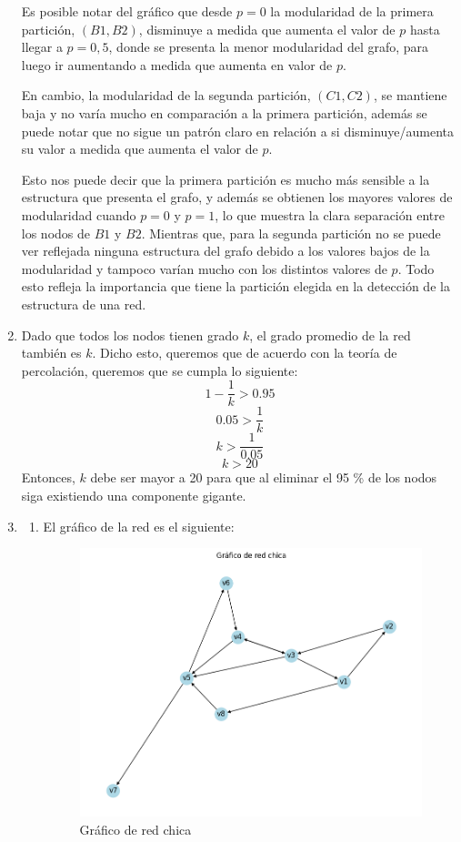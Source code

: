\documentclass[12pt]{article}
\begin{document}
\begin{enumerate}
    Es posible notar del gráfico que desde $p = 0$ la modularidad de la primera partición, $(B1, B2)$, disminuye a medida que aumenta el valor de $p$ hasta llegar a $p = 0,5$, donde se presenta la menor modularidad del grafo, para luego ir aumentando a medida que aumenta en valor de $p$.

    En cambio, la modularidad de la segunda partición, $(C1, C2)$, se mantiene baja y no varía mucho en comparación a la primera partición, además se puede notar que no sigue un patrón claro en relación a si disminuye/aumenta su valor a medida que aumenta el valor de $p$. 

    Esto nos puede decir que la primera partición es mucho más sensible a la estructura que presenta el grafo, y además se obtienen los mayores valores de modularidad cuando $p = 0$ y $p = 1$, lo que muestra la clara separación entre los nodos de $B1$ y $B2$. Mientras que, para la segunda partición no se puede ver reflejada ninguna estructura del grafo debido a los valores bajos de la modularidad y tampoco varían mucho con los distintos valores de $p$. Todo esto refleja la importancia que tiene la partición elegida en la detección de la estructura de una red.
    
    \item Dado que todos los nodos tienen grado $k$, el grado promedio de la red también es $k$. Dicho esto, queremos que de acuerdo con la teoría de percolación, queremos que se cumpla lo siguiente: $$1-\frac{1}{k} > 0.95$$ $$0.05>\frac{1}{k}$$ $$k>\frac{1}{0.05}$$ $$k>20$$ Entonces, $k$ debe ser mayor a 20 para que al eliminar el 95 \% de los nodos siga existiendo una componente gigante.
    
    \item
    \begin{enumerate}
        \item El gráfico de la red es el siguiente:
        \begin{figure}[H]
            \centering
            \includegraphics[scale=0.5]{images/grafico_red_chica.png}
            \caption{Gráfico de red chica}
            \label{fig:graph_red_chica}
        \end{figure}


\end{enumerate}
\end{enumerate}
\end{document}
